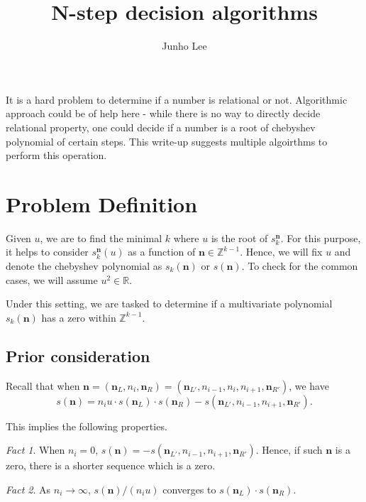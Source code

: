 \documentclass{article}
\title{N-step decision algorithms}
\author{Junho Lee}
\theoremstyle{definition}
\theoremstyle{plain}
\theoremstyle{remark}
\newtheorem*{fact}{Fact}
\numberwithin{equation}{section}
\newcommand{\integer}{\mathbb{Z}}
\newcommand{\real}{\mathbb{R}}
\begin{document}
\pagecolor{white}
\color{black}
\maketitle

It is a hard problem to determine if a number is relational or not.
Algorithmic approach could be of help here -
while there is no way to directly decide relational property,
one could decide if a number is a root of chebyshev polynomial of certain steps.
This write-up suggests multiple algoirthms to perform this operation.

\section{Problem Definition}

Given $u$, we are to find the minimal $k$ where $u$ is the root of $s^{\mathbf{n}}_k$.
For this purpose, it helps to consider $s^{\mathbf{n}}_k(u)$ as a function of $\mathbf{n} \in \integer^{k-1}$.
Hence, we will fix $u$ and denote the chebyshev polynomial as $s_k(\mathbf{n})$ or $s(\mathbf{n})$.
To check for the common cases, we will assume $u^2 \in \real$.

Under this setting, we are tasked to determine if a multivariate polynomial $s_k(\mathbf{n})$
has a zero within $\integer^{k-1}$.

\subsection{Prior consideration}

Recall that when $\mathbf{n} = (\mathbf{n}_L, n_i, \mathbf{n}_R)
  = (\mathbf{n}_{L'}, n_{i-1}, n_i, n_{i+1}, \mathbf{n}_{R'})$,
we have
\begin{equation}\label{key_equation}
  s(\mathbf{n}) =
  n_i u \cdot s(\mathbf{n}_L) \cdot s(\mathbf{n}_R)
  - s(\mathbf{n}_{L'}, n_{i-1}, n_{i+1}, \mathbf{n}_{R'}).
\end{equation}

This implies the following properties.
\begin{fact}
  When $n_i = 0$, $s(\mathbf{n}) = - s(\mathbf{n}_{L'}, n_{i-1}, n_{i+1}, \mathbf{n}_{R'})$.
  Hence, if such $\mathbf{n}$ is a zero, there is a shorter sequence which is a zero.
\end{fact}
\begin{fact}
  As $n_i \to \infty$, $s(\mathbf{n}) / (n_i u)$ converges to $s(\mathbf{n}_L) \cdot s(\mathbf{n}_R)$.
\end{fact}
\end{document}
